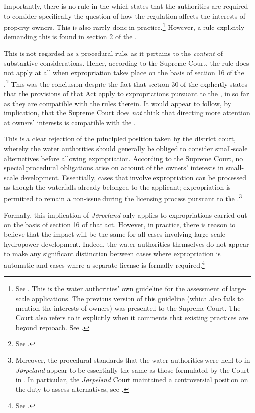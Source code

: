 Importantly, there is no rule in the \cite{wra17} which states that the authorities are required to consider specifically the question of how the regulation affects the interests of property owners. This is also rarely done in practice.\footnote{See \cite{stokker10}. This is the water authorities' own guideline for the assessment of large-scale applications. The previous version of this guideline (which also fails to mention the interests of owners) was presented to the Supreme Court. The Court also refers to it explicitly when it comments that existing practices are beyond reproach. See \cite[51]{jorpeland11}.} However, a rule explicitly demanding this is found in section 2 of the \cite{ea59}. 

This is not regarded as a procedural rule, as it pertains to the {\it content} of substantive considerations. Hence, according to the Supreme Court, the rule does not apply at all when expropriation takes place on the basis of section 16 of the \cite{wra17}.\footnote{See \cite[30]{jorpeland11}.} This was the conclusion despite the fact that section 30 of the \cite{ea59} explicitly states that the provisions of that Act apply to expropriations pursuant to the \cite{wra17}, in so far as they are compatible with the rules therein. It would appear to follow, by implication, that the Supreme Court does {\it not} think that directing more attention at owners' interests is compatible with the \cite{wra17}.

This is a clear rejection of the principled position taken by the district court, whereby the water authorities should generally be obliged to consider small-scale alternatives before allowing expropriation. According to the Supreme Court, no special procedural obligations arise on account of the owners' interests in small-scale development. Essentially, cases that involve expropriation can be processed as though the waterfalls already belonged to the applicant; expropriation is permitted to remain a non-issue during the licensing process pursuant to the \cite{wra17}.\footnote{Moreover, the procedural standards that the water authorities were held to in {\it Jørpeland} appear to be essentially the same as those formulated by the Court in \cite{alta82}. In particular, the {\it Jørpeland} Court maintained a controversial position on the duty to assess alternatives, see \cite[157]{winge13}.}

Formally, this implication of {\it Jørpeland} only applies to expropriations carried out on the basis of section 16 of that act. However, in practice, there is reason to believe that the impact will be the same for all cases involving large-scale hydropower development. Indeed, the water authorities themselves do not appear to make any significant distinction between cases where expropriation is automatic and cases where a separate license is formally required.\footnote{See \cite{flatby08}.}

